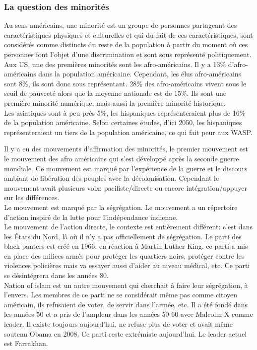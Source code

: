 \documentclass[10pt, a4paper, openany]{book}
\begin{document}
\subsubsection{La question des minorités}
Au sens américains, une minorité est un groupe de personnes partageant des caractéristiques physiques et culturelles et qui du fait de ces caractéristiques, sont considérés comme distincts du reste de la population à partir du moment où ces personnes font l'objet d'une discrimination et sont sous représenté politiquement. \\
Aux US, une des premières minorités sont les afro-américains. Il y a 13\% d'afro-américains dans la population américaine. Cependant, les élus afro-américains sont 8\%, ils sont donc sous représentant. 28\% des afro-américains vivent sous le seuil de pauvreté alors que la moyenne nationale est de 15\%. Ils sont une première minorité numérique, mais aussi la première minorité historique. \\
Les asiatiques sont à peu près 5\%, les hispaniques représenteraient plus de 16\% de la population américaine. Selon certaines études, d'ici 2050, les hispaniques représenteraient un tiers de la population américaine, ce qui fait peur aux WASP.


Il y a eu des mouvements d'affirmation des minorités, le premier mouvement est le mouvement des afro américains qui s'est développé après la seconde guerre mondiale. Ce mouvement est marqué par l'expérience de la guerre et le discours ambiant de libération des peuples avec la décolonisation. Cependant le mouvement avait plusieurs voix: pacifiste/directe ou encore intégration/appuyer sur les différences. \\
Le mouvement est marqué par la ségrégation. Le mouvement a un répertoire d'action inspiré de la lutte pour l'indépendance indienne. \\
Le mouvement de l'action directe, le contexte est entièrement différent: c'est dans les États du Nord, là où il n'y a pas officiellement de ségrégation. Le parti des black panters est créé en 1966, en réaction à Martin Luther King, ce parti a mis en place des milices armés pour protéger les quartiers noirs, protéger contre les violences policières mais va essayer aussi d'aider au niveau médical, etc. Ce parti se désintégrera dans les années 80. \\
Nation of islam est un autre mouvement qui cherchait à faire leur ségrégation, à l'envers. Les membres de ce parti ne se considérait même pas comme citoyen américain, ils refusaient de voter, de servir dans l'armée, etc. Il a été fondé dans les années 50 et a pris de l'ampleur dans les années 50-60 avec Malcolm X comme leader. Il existe toujours aujourd'hui, ne refuse plus de voter et avait même soutenu Obama en 2008. Ce parti reste extrémiste aujourd'hui. Le leader actuel est Farrakhan.
\end{document}
